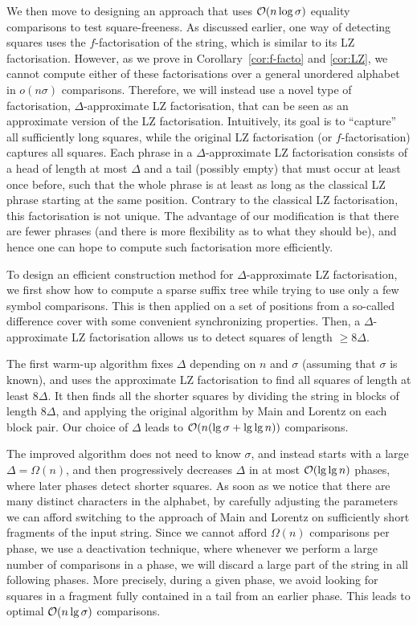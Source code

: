We then move to designing an approach that uses $\mathcal{O}(n\log \sigma)$ equality comparisons to test square-freeness.
As discussed earlier, one way of detecting squares uses the $f$-factorisation of the string, which is similar to its LZ factorisation.
However, as we prove in Corollary~\ref{cor:f-facto} and \ref{cor:LZ}, we cannot compute either of these factorisations over a general unordered alphabet in $o(n\sigma)$ comparisons.
Therefore, we will instead use a novel type of factorisation, $\Delta$-approximate LZ factorisation, that can be seen as an approximate
version of the LZ factorisation.
Intuitively, its goal is to ``capture'' all sufficiently long squares, while the original LZ factorisation (or $f$-factorisation)
captures all squares. Each phrase in a $\Delta$-approximate LZ factorisation consists of a head of length at most $\Delta$ and a tail
(possibly empty) that must occur at least once before, such that the whole phrase is at least as long as the classical LZ phrase starting
at the same position. Contrary to the classical LZ factorisation, this factorisation is not unique. 
The advantage of our modification is that there are fewer phrases (and there is more flexibility as to what they should be), and
hence one can hope to compute such factorisation more efficiently.

To design an efficient construction method for $\Delta$-approximate LZ factorisation, we first show how to compute a sparse
suffix tree while trying to use only a few symbol comparisons. This is then applied on a set of positions from a so-called
difference cover with some convenient synchronizing properties.
Then, a $\Delta$-approximate LZ factorisation allows us to detect squares of length $\geq 8\Delta$.

The first warm-up algorithm fixes $\Delta$ depending on $n$ and $\sigma$ (assuming that $\sigma$ is known), and uses
the approximate LZ factorisation to find all squares of length at least $8\Delta$. It then finds all the shorter squares by dividing
the string in blocks of length $8\Delta$, and applying the original algorithm by Main and Lorentz on each
block pair. Our choice of $\Delta$ leads to $\mathcal{O}(n (\lg \sigma + \lg \lg n))$ comparisons.

The improved algorithm does not need to know $\sigma$, and instead starts with a large $\Delta = \Omega(n)$, and then
progressively decreases $\Delta$ in at most $\mathcal{O}(\lg \lg n)$ phases, where later phases detect shorter squares.
As soon as we notice that there are many distinct characters in the alphabet, by carefully adjusting the parameters
we can afford switching to the approach of Main and Lorentz on sufficiently short fragments of the input string. 
Since we cannot afford $\Omega(n)$ comparisons per phase, we use a deactivation technique, where whenever we perform a large
number of comparisons in a phase, we will discard a large part of the string in all following phases.
More precisely, during a given phase, we avoid looking for squares in a fragment fully contained in a tail from an earlier phase.
This leads to optimal $\mathcal{O}(n \lg \sigma)$ comparisons.

